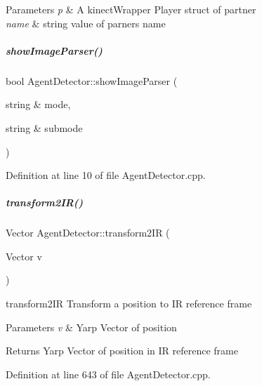 \begin{DoxyParams}{Parameters}
{\em p} & A kinect\+Wrapper Player struct of partner \\
\hline
{\em name} & string value of parner\textquotesingle{}s name \\
\hline
\end{DoxyParams}
\mbox{\label{group__agentDetector_a157b0882a6adf6678897f913c96de2f8}} 
\subparagraph{\texorpdfstring{show\+Image\+Parser()}{showImageParser()}}
{\footnotesize\ttfamily bool Agent\+Detector\+::show\+Image\+Parser (\begin{DoxyParamCaption}\item[{string \&}]{mode,  }\item[{string \&}]{submode }\end{DoxyParamCaption})\hspace{0.3cm}{\ttfamily [protected]}}



Definition at line 10 of file Agent\+Detector.\+cpp.

\mbox{\label{group__agentDetector_a8639602ced96cef823d2f3d442159d94}} 
\subparagraph{\texorpdfstring{transform2\+I\+R()}{transform2IR()}}
{\footnotesize\ttfamily Vector Agent\+Detector\+::transform2\+IR (\begin{DoxyParamCaption}\item[{Vector}]{v }\end{DoxyParamCaption})}



transform2\+IR Transform a position to IR reference frame 


\begin{DoxyParams}{Parameters}
{\em v} & Yarp Vector of position \\
\hline
\end{DoxyParams}
\begin{DoxyReturn}{Returns}
Yarp Vector of position in IR reference frame 
\end{DoxyReturn}


Definition at line 643 of file Agent\+Detector.\+cpp.

